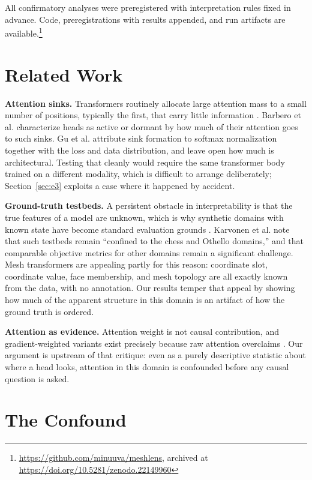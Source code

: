 \documentclass[conference]{IEEEtran}
\begin{document}
All confirmatory analyses were preregistered with interpretation rules fixed in
advance. Code, preregistrations with results appended, and run artifacts are
available.\footnote{\url{https://github.com/minuuva/meshlens}, archived at
\url{https://doi.org/10.5281/zenodo.22149960}}

\section{Related Work}

\textbf{Attention sinks.} Transformers routinely allocate large attention mass to
a small number of positions, typically the first, that carry little information
\cite{xiao2023streamingllm}. Barbero et al. \cite{barbero2025active} characterize
heads as active or dormant by how much of their attention goes to such sinks. Gu
et al. \cite{gu2025attention} attribute sink formation to softmax normalization
together with the loss and data distribution, and leave open how much is
architectural. Testing that cleanly would require the same transformer body
trained on a different modality, which is difficult to arrange deliberately;
Section~\ref{sec:e3} exploits a case where it happened by accident.

\textbf{Ground-truth testbeds.} A persistent obstacle in interpretability is that
the true features of a model are unknown, which is why synthetic domains with
known state have become standard evaluation grounds
\cite{li2023emergent,karvonen2024measuring}. Karvonen et al.
\cite{karvonen2024measuring} note that such testbeds remain ``confined to the
chess and Othello domains,'' and that comparable objective metrics for other
domains remain a significant challenge. Mesh transformers are appealing partly
for this reason: coordinate slot, coordinate value, face membership, and mesh
topology are all exactly known from the data, with no annotation. Our results
temper that appeal by showing how much of the apparent structure in this domain
is an artifact of how the ground truth is ordered.

\textbf{Attention as evidence.} Attention weight is not causal contribution, and
gradient-weighted variants exist precisely because raw attention overclaims
\cite{barkan2021gradsam,jiang2025devils}. Our argument is upstream of that
critique: even as a purely descriptive statistic about where a head looks,
attention in this domain is confounded before any causal question is asked.

\section{The Confound}
\label{sec:confound}
\end{document}
